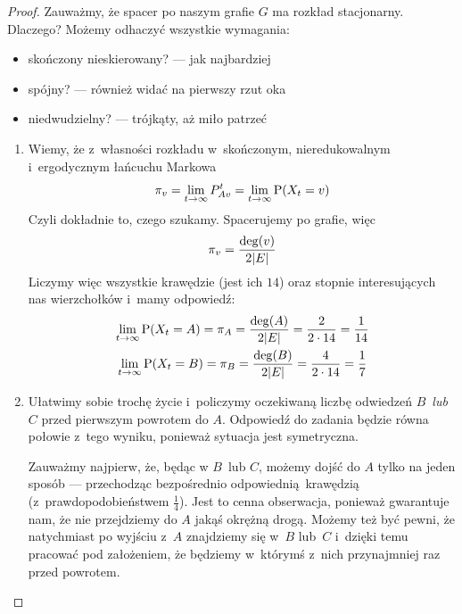 \begin{proof} Zauważmy, że spacer po naszym grafie \(G\) ma rozkład stacjonarny. Dlaczego? Możemy odhaczyć wszystkie wymagania:
	\begin{itemize}
		\item skończony nieskierowany? --- jak najbardziej
		\item spójny? --- również widać na pierwszy rzut oka
		\item niedwudzielny? --- trójkąty, aż miło patrzeć
	\end{itemize}
	\begin{enumerate}[label=(\roman*)]
		\item Wiemy, że z~własności rozkładu w~skończonym, nieredukowalnym i~ergodycznym łańcuchu Markowa
		      \begin{equation*}
			      \pi_v = \lim_{t \to \infty} P_{Av}^t = \lim_{t \to \infty} \prob\pars{X_t = v}
		      \end{equation*}
		      Czyli dokładnie to, czego szukamy. Spacerujemy po grafie, więc
		      \begin{equation*}
			      \pi_v = \frac{\deg\pars{v}}{2\card{E}}
		      \end{equation*}
		      Liczymy więc wszystkie krawędzie (jest ich \(14\)) oraz stopnie interesujących nas wierzchołków i~mamy odpowiedź:
		      \begin{gather*}
			      \lim_{t \to \infty} \prob\pars{X_t = A}
			      = \pi_A
			      = \frac{\deg\pars{A}}{2\card{E}}
			      = \frac{2}{2 \cdot 14}
			      = \frac{1}{14}\\
			      \lim_{t \to \infty} \prob\pars{X_t = B}
			      = \pi_B
			      = \frac{\deg\pars{B}}{2\card{E}}
			      = \frac{4}{2 \cdot 14}
			      = \frac{1}{7}
		      \end{gather*}
		\item Ułatwimy sobie trochę życie i~policzymy oczekiwaną liczbę odwiedzeń \(B\)~\emph{lub} \(C\) przed pierwszym powrotem do \(A\). Odpowiedź do zadania będzie równa połowie z~tego wyniku, ponieważ sytuacja jest symetryczna.

		      Zauważmy najpierw, że, będąc w \(B\)~lub \(C\), możemy dojść do \(A\) tylko na jeden sposób --- przechodząc bezpośrednio odpowiednią krawędzią (z~prawdopodobieństwem \(\frac{1}{4}\)). Jest to cenna obserwacja, ponieważ gwarantuje nam, że nie przejdziemy do \(A\) jakąś okrężną drogą. Możemy też być pewni, że natychmiast po wyjściu z~\(A\) znajdziemy się w~\(B\) lub~\(C\) i~dzięki temu pracować pod założeniem, że będziemy w~którymś z~nich przynajmniej raz przed powrotem.


\end{enumerate}
\end{proof}
